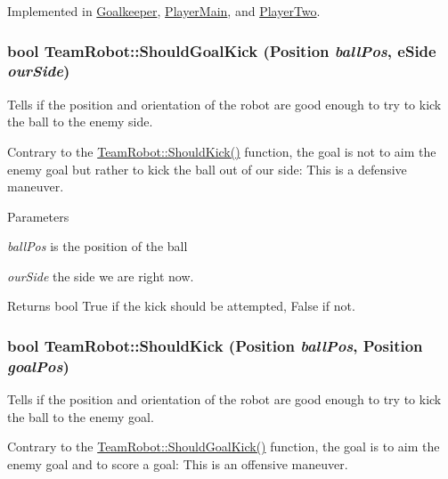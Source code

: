Implemented in \hyperlink{classGoalkeeper_abc394351f7c0d552c6e96da422c772ec}{Goalkeeper}, \hyperlink{classPlayerMain_a8f0320189df15529662c7f16d2f74084}{PlayerMain}, and \hyperlink{classPlayerTwo_a7ac9a9a4f1dedee2006e6a0c79f37c0c}{PlayerTwo}.

\hypertarget{classTeamRobot_ae7f6fa303c865dad297b662731165883}{
\subsubsection[{ShouldGoalKick}]{\setlength{\rightskip}{0pt plus 5cm}bool TeamRobot::ShouldGoalKick (Position {\em ballPos}, \/  eSide {\em ourSide})}}
\label{classTeamRobot_ae7f6fa303c865dad297b662731165883}


Tells if the position and orientation of the robot are good enough to try to kick the ball to the enemy side. 

Contrary to the \hyperlink{classTeamRobot_ac979572f4899940e88f067102ac1ae46}{TeamRobot::ShouldKick()} function, the goal is not to aim the enemy goal but rather to kick the ball out of our side: This is a defensive maneuver.


\begin{DoxyParams}{Parameters}
\item[{\em ballPos}]is the position of the ball \item[{\em ourSide}]the side we are right now. \end{DoxyParams}
\begin{DoxyReturn}{Returns}
bool True if the kick should be attempted, False if not. 
\end{DoxyReturn}
\hypertarget{classTeamRobot_ac979572f4899940e88f067102ac1ae46}{
\subsubsection[{ShouldKick}]{\setlength{\rightskip}{0pt plus 5cm}bool TeamRobot::ShouldKick (Position {\em ballPos}, \/  Position {\em goalPos})}}
\label{classTeamRobot_ac979572f4899940e88f067102ac1ae46}


Tells if the position and orientation of the robot are good enough to try to kick the ball to the enemy goal. 

Contrary to the \hyperlink{classTeamRobot_ae7f6fa303c865dad297b662731165883}{TeamRobot::ShouldGoalKick()} function, the goal is to aim the enemy goal and to score a goal: This is an offensive maneuver.


